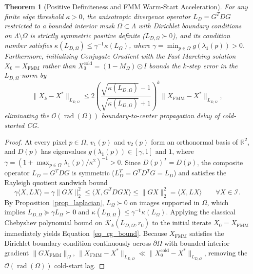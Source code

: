 \documentclass{amsart}
\newtheorem{theorem}{Theorem}[section]
\begin{document}
\begin{theorem}[Positive Definiteness and FMM Warm-Start Acceleration]\label{thm_hybrid}
    For any finite edge threshold $\kappa > 0$, the anisotropic divergence operator $L_D = G^T D G$ restricted to a bounded interior mask $\Omega \subset \Lambda$ with Dirichlet boundary conditions on $\Lambda \setminus \Omega$ is strictly symmetric positive definite ($L_{D,\Omega} \succ 0$), and its condition number satisfies $\kappa(L_{D,\Omega}) \leq \gamma^{-1} \kappa(L_\Omega)$, where $\gamma = \min_{p \in \Omega} g(\lambda_1(p)) > 0$. Furthermore, initializing Conjugate Gradient with the Fast Marching solution $X_0 = X_{\text{FMM}}$ rather than $X_0^{\text{cold}} = (1 - M_\Omega) \odot I$ bounds the $k$-step error in the $L_{D,\Omega}$-norm by
    \begin{equation}\label{eq_cg_bound}
        \|X_k - X^*\|_{L_{D,\Omega}} \leq 2\left(\frac{\sqrt{\kappa(L_{D,\Omega})} - 1}{\sqrt{\kappa(L_{D,\Omega})} + 1}\right)^k \|X_{\text{FMM}} - X^*\|_{L_{D,\Omega}},
    \end{equation}
    eliminating the $\mathcal{O}(\operatorname{rad}(\Omega))$ boundary-to-center propagation delay of cold-started CG.
\end{theorem}
\begin{proof}
    At every pixel $p \in \Omega$, $v_1(p)$ and $v_2(p)$ form an orthonormal basis of $\mathbb{R}^2$, and $D(p)$ has eigenvalues $g(\lambda_1(p)) \in [\gamma, 1]$ and $1$, where $\gamma = (1 + \max_{p \in \Omega} \lambda_1(p) / \kappa^2)^{-1} > 0$. Since $D(p)^T = D(p)$, the composite operator $L_D = G^T D G$ is symmetric ($L_D^T = G^T D^T G = L_D$) and satisfies the Rayleigh quotient sandwich bound
    \[
        \gamma \langle X, L X \rangle = \gamma \|G X\|_2^2 \leq \langle X, G^T D G X \rangle \leq \|G X\|_2^2 = \langle X, L X \rangle \qquad \forall X \in \mathcal{I}.
    \]
    By Proposition~\ref{prop_laplacian}, $L_\Omega \succ 0$ on images supported in $\Omega$, which implies $L_{D,\Omega} \succeq \gamma L_\Omega \succ 0$ and $\kappa(L_{D,\Omega}) \leq \gamma^{-1}\kappa(L_\Omega)$. Applying the classical Chebyshev polynomial bound on $\mathcal{K}_k(L_{D,\Omega}, r_0)$ to the initial iterate $X_0 = X_{\text{FMM}}$ immediately yields Equation~\eqref{eq_cg_bound}. Because $X_{\text{FMM}}$ satisfies the Dirichlet boundary condition continuously across $\partial\Omega$ with bounded interior gradient $\|G X_{\text{FMM}}\|_\Omega$, $\|X_{\text{FMM}} - X^*\|_{L_{D,\Omega}} \ll \|X_0^{\text{cold}} - X^*\|_{L_{D,\Omega}}$, removing the $\mathcal{O}(\operatorname{rad}(\Omega))$ cold-start lag.
\end{proof}
\end{document}
